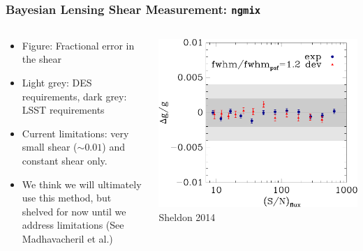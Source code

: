 \documentclass{beamer}
\newcommand{\ngmix}{\texttt{ngmix}}
\begin{document}
\frame
{
    \frametitle{Bayesian Lensing Shear Measurement: \ngmix}

    \fontsize{9}{0.8\baselineskip}
    \begin{columns}
        \begin{column}{0.4\textwidth}
            \begin{itemize}

                \item Figure: Fractional error in the shear

                \item Light grey: DES requirements, dark grey: LSST requirements

                \item Current limitations:  very small shear ($\sim 0.01$) and 
                    constant shear only.

                \item We think we will ultimately use this method, but shelved
                    for now until we address limitations (See Madhavacheril et
                    al.)

            \end{itemize}
        \end{column}
        \begin{column}{0.6\textwidth}
            \begin{center}
                \includegraphics[width=\textwidth]{ngmix-flux-s2n-sigrat-20.pdf}
                \newline
                Sheldon 2014
            \end{center}
        \end{column}
    \end{columns}

}
\end{document}
